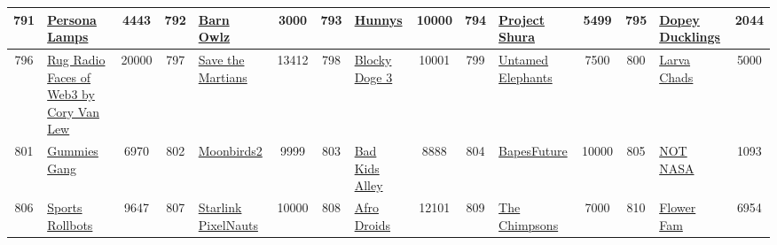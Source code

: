\begin{table*}[]
{\begin{tabular}{|c|l|c|c|l|c|c|l|c|c|l|c|c|l|c|}
        791   & \href{https://www.personalamps.com/}{Persona Lamps}                                & 4443              & 792   & \href{https://opensea.io/collection/barn-owlz}{Barn Owlz}                                         & 3000              & 793   & \href{https://hunnys.io}{Hunnys}                                                  & 10000             & 794   & \href{https://www.projectshura.net/}{Project Shura}                           & 5499              & 795   & \href{https://dopeyducklings.com/}{Dopey Ducklings}                                       & 2044                                    \\ \hline
        796   & \href{https://www.rug.fm/}{Rug Radio Faces of Web3 by Cory Van Lew}                & 20000             & 797   & \href{https://www.savethemartians.com/}{Save the Martians}                                        & 13412             & 798   & \href{https://opensea.io/collection/blockydoge3}{Blocky Doge 3}                   & 10001             & 799   & \href{https://untamedelephants.io/}{Untamed Elephants}                        & 7500              & 800   & \href{https://www.larvachads.com/}{Larva Chads}                                           & 5000                                    \\ \hline
        801   & \href{http://www.gummiesgang.com}{Gummies Gang}                                    & 6970              & 802   & \href{http://boonmirds.xyz}{Moonbirds2}                                                           & 9999              & 803   & \href{http://www.joyunknown.com}{Bad Kids Alley}                                  & 8888              & 804   & \href{https://bapes.xyz/}{BapesFuture}                                        & 10000             & 805   & \href{http://www.not-nasa.com}{NOT NASA}                                                  & 1093                                    \\ \hline
        806   & \href{http://rollbot.com/}{Sports Rollbots}                                        & 9647              & 807   & \href{https://starltoken.com/}{Starlink PixelNauts}                                               & 10000             & 808   & \href{https://www.afrodroids.io/}{Afro Droids}                                    & 12101             & 809   & \href{https://thechimpsons.xyz/}{The Chimpsons}                               & 7000              & 810   & \href{https://flowerfam.earth/}{Flower Fam}                                               & 6954                                    \\ \hline

\end{tabular}}
\end{table*}
